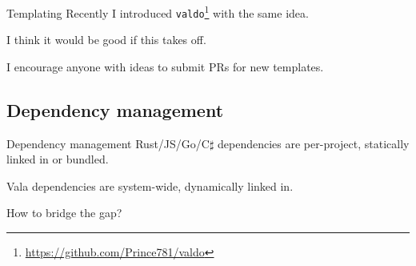 \documentclass[t]{beamer}
\newcommand{\fancyurl}[1]{\href{#1}{#1}}
\begin{document}



\begin{frame}[c]{Templating}
    Recently I introduced \texttt{valdo}\footnote{\fancyurl{https://github.com/Prince781/valdo}} with the same idea.
    
    \exampleCode
    
    I think it would be good if this takes off.
    
    I encourage anyone with ideas to submit PRs for new templates.
\end{frame}

\subsection{Dependency management}
\begin{frame}[c]{Dependency management}
    Rust/JS/Go/C$\sharp$ dependencies are per-project, statically linked in or bundled.
    
    Vala dependencies are system-wide, dynamically linked in.
    
    How to bridge the gap?
\end{frame}
\end{document}

